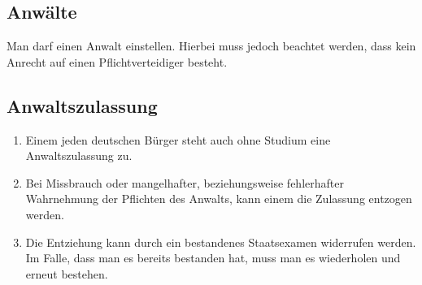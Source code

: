 \documentclass{article}
\begin{document}
\subsection{Anwälte}
Man darf einen Anwalt einstellen. Hierbei muss jedoch beachtet werden, dass kein Anrecht auf einen Pflichtverteidiger besteht.

\subsection{Anwaltszulassung}
\begin{enumerate}[(1)]
    \item Einem jeden deutschen Bürger steht auch ohne Studium eine Anwaltszulassung zu.
    \item Bei Missbrauch oder mangelhafter, beziehungsweise fehlerhafter Wahrnehmung der Pflichten des Anwalts, kann einem die Zulassung entzogen werden.
    \item Die Entziehung kann durch ein bestandenes Staatsexamen widerrufen werden. Im Falle, dass man es bereits bestanden hat, muss man es wiederholen und erneut bestehen.
\end{enumerate}
\end{document}
